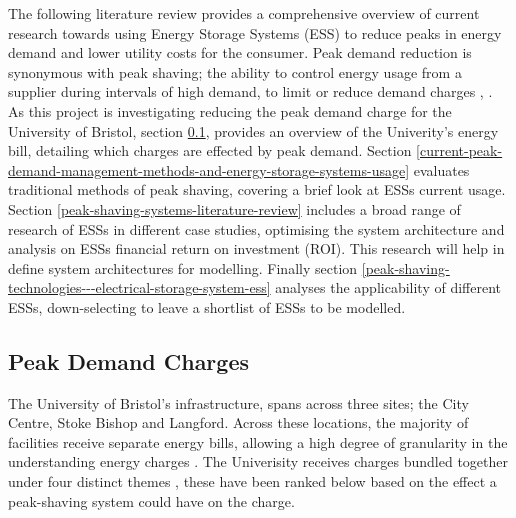 The following literature review provides a comprehensive overview of
current research towards using Energy Storage Systems (ESS) to reduce
peaks in energy demand and lower utility costs for the consumer. Peak
demand reduction is synonymous with peak shaving; the ability to control
energy usage from a supplier during intervals of high demand, to limit
or reduce demand charges \cite{schneiderRECPS}, \cite{baldorPS}. As this
project is investigating reducing the peak demand charge for the
University of Bristol, section \ref{peak-demand-charges}, provides an
overview of the Univerity's energy bill, detailing which charges are
effected by peak demand. Section
\ref{current-peak-demand-management-methods-and-energy-storage-systems-usage}
evaluates traditional methods of peak shaving, covering a brief look at
ESSs current usage. Section \ref{peak-shaving-systems-literature-review}
includes a broad range of research of ESSs in different case studies,
optimising the system architecture and analysis on ESSs financial return
on investment (ROI). This research will help in define system
architectures for modelling. Finally section
\ref{peak-shaving-technologies---electrical-storage-system-ess} analyses
the applicability of different ESSs, down-selecting to leave a shortlist
of ESSs to be modelled.

\subsection{Peak Demand Charges}\label{peak-demand-charges}

The University of Bristol's infrastructure, spans across three sites;
the City Centre, Stoke Bishop and Langford. Across these locations, the
majority of facilities receive separate energy bills, allowing a high
degree of granularity in the understanding energy charges
\cite{Jbrentmeet}. The Univerisity receives charges bundled together
under four distinct themes \cite{Jbrentmeet}, these have been ranked
below based on the effect a peak-shaving system could have on the
charge.

